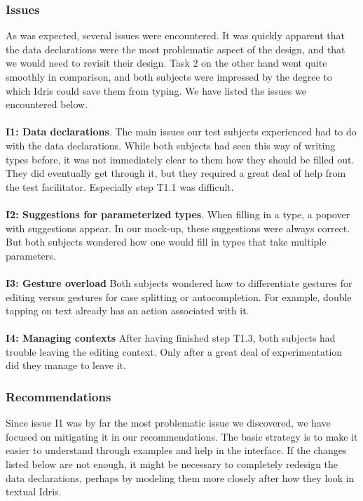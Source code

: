 \subsubsection{Issues}
\label{sec:first_issues}
As was expected, several issues were encountered. It was quickly apparent that
the data declarations were the most problematic aspect of the design, and that
we would need to revisit their design. Task 2 on the other hand went quite
smoothly in comparison, and both subjects were impressed by the degree to
which Idris could save them from typing. We have listed the issues we
encountered below. \\ \\
\textbf{I1: Data declarations}.
The main issues our test subjects experienced had to do with the data
declarations. While both subjects had seen this way of writing types
before, it was not immediately clear to them how they should be filled out.
They did eventually get through it, but they required a great deal of help
from the test facilitator. Especially step T1.1 was difficult.\\ \\
\textbf{I2: Suggestions for parameterized types}.
When filling in a type, a popover with suggestions appear. In our mock-up,
these suggestions were always correct. But both subjects wondered how one would
fill in types that take multiple parameters. \\ \\
\textbf{I3: Gesture overload}
Both subjects wondered how to differentiate gestures for editing versus
gestures for case splitting or autocompletion. For example, double tapping on
text already has an action associated with it. \\ \\ 
\textbf{I4: Managing contexts}
After having finished step T1.3, both subjects had trouble leaving the editing
context. Only after a great deal of experimentation did they manage to leave
it.


\subsubsection{Recommendations}
\label{sec:first_recommendations}
Since issue I1 was by far the most problematic issue we discovered, we have
focused on mitigating it in our recommendations. The basic strategy is to make
it easier to understand through examples and help in the interface. If the
changes listed below are not enough, it might be necessary to completely
redesign the data declarations, perhaps by modeling them more closely after how
they look in textual Idris.

